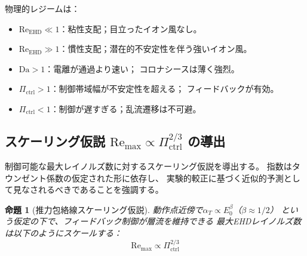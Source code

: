 \documentclass[12pt,twocolumn]{ltjsarticle}
\newtheorem{proposition}[theorem]{命題}
\newcommand{\Reehd}{\mathrm{Re}_{\mathrm{EHD}}}
\newcommand{\Pctrl}{\Pi_{\mathrm{ctrl}}}
\begin{document}
物理的レジームは：
\begin{itemize}
  \item $\Reehd \ll 1$：粘性支配；目立ったイオン風なし。
  \item $\Reehd \gg 1$：慣性支配；潜在的不安定性を伴う強いイオン風。
  \item $\mathrm{Da} > 1$：電離が通過より速い；
    コロナシースは薄く強烈。
  \item $\Pctrl > 1$：制御帯域幅が不安定性を超える；
    フィードバックが有効。
  \item $\Pctrl < 1$：制御が遅すぎる；乱流遷移は不可避。
\end{itemize}

\subsection{スケーリング仮説 $\mathrm{Re}_{\max} \propto \Pctrl^{2/3}$ の導出}
\label{sec:scaling}

制御可能な最大レイノルズ数に対するスケーリング仮説を導出する。
指数はタウンゼント係数の仮定された形に依存し、
実験的較正に基づく近似的予測として見なされるべきであることを強調する。

\begin{proposition}[推力包絡線スケーリング仮説]
\label{prop:scaling}
動作点近傍で$\alpha_T \propto E_0^{\beta}$（$\beta \approx 1/2$）
という仮定の下で、フィードバック制御が層流を維持できる
最大EHDレイノルズ数は以下のようにスケールする：
\begin{equation}
\boxed{
  \mathrm{Re}_{\max} \propto \Pctrl^{2/3}
}
\label{eq:scaling_law}
\end{equation}
\end{proposition}
\end{document}
